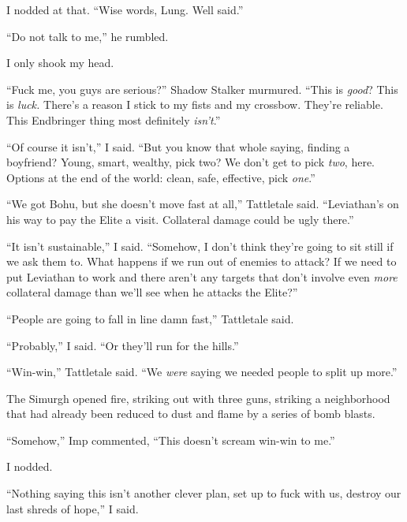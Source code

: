 I nodded at that.  ``Wise words, Lung.  Well said.''



``Do not talk to me,'' he rumbled.



I only shook my head.



``Fuck me, you guys are serious?''  Shadow Stalker murmured.  ``This is \emph{good}?  This is \emph{luck.  }There's a reason I stick to my fists and my crossbow.  They're reliable.  This Endbringer thing most definitely \emph{isn't}.''



``Of course it isn't,'' I said.  ``But you know that whole saying, finding a boyfriend?  Young, smart, wealthy, pick two?  We don't get to pick \emph{two}, here.  Options at the end of the world: clean, safe, effective, pick \emph{one}.''



``We got Bohu, but she doesn't move fast at all,'' Tattletale said.  ``Leviathan's on his way to pay the Elite a visit.  Collateral damage could be ugly there.''



``It isn't sustainable,'' I said.  ``Somehow, I don't think they're going to sit still if we ask them to.  What happens if we run out of enemies to attack?  If we need to put Leviathan to work and there aren't any targets that don't involve even \emph{more} collateral damage than we'll see when he attacks the Elite?''



``People are going to fall in line damn fast,'' Tattletale said.



``Probably,'' I said.  ``Or they'll run for the hills.''



``Win-win,'' Tattletale said.  ``We \emph{were} saying we needed people to split up more.''



The Simurgh opened fire, striking out with three guns, striking a neighborhood that had already been reduced to dust and flame by a series of bomb blasts.



``Somehow,'' Imp commented, ``This doesn't scream win-win to me.''



I nodded.



``Nothing saying this isn't another clever plan, set up to fuck with us, destroy our last shreds of hope,'' I said.



